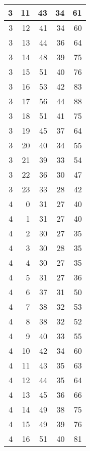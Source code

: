 \begin{longtable}{|r|r|r|r|r|}
    3     & 11    & 43    & 34    & 61 \\\hline
    3     & 12    & 41    & 34    & 60 \\\hline
    3     & 13    & 44    & 36    & 64 \\\hline
    3     & 14    & 48    & 39    & 75 \\\hline
    3     & 15    & 51    & 40    & 76 \\\hline
    3     & 16    & 53    & 42    & 83 \\\hline
    3     & 17    & 56    & 44    & 88 \\\hline
    3     & 18    & 51    & 41    & 75 \\\hline
    3     & 19    & 45    & 37    & 64 \\\hline
    3     & 20    & 40    & 34    & 55 \\\hline
    3     & 21    & 39    & 33    & 54 \\\hline
    3     & 22    & 36    & 30    & 47 \\\hline
    3     & 23    & 33    & 28    & 42 \\\hline
    4     & 0     & 31    & 27    & 40 \\\hline
    4     & 1     & 31    & 27    & 40 \\\hline
    4     & 2     & 30    & 27    & 35 \\\hline
    4     & 3     & 30    & 28    & 35 \\\hline
    4     & 4     & 30    & 27    & 35 \\\hline
    4     & 5     & 31    & 27    & 36 \\\hline
    4     & 6     & 37    & 31    & 50 \\\hline
    4     & 7     & 38    & 32    & 53 \\\hline
    4     & 8     & 38    & 32    & 52 \\\hline
    4     & 9     & 40    & 33    & 55 \\\hline
    4     & 10    & 42    & 34    & 60 \\\hline
    4     & 11    & 43    & 35    & 63 \\\hline
    4     & 12    & 44    & 35    & 64 \\\hline
    4     & 13    & 45    & 36    & 66 \\\hline
    4     & 14    & 49    & 38    & 75 \\\hline
    4     & 15    & 49    & 39    & 76 \\\hline
    4     & 16    & 51    & 40    & 81 \\\hline

\end{longtable}
